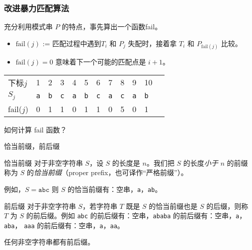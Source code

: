 \documentclass{ctexbeamer}
\newcommand{\str}[1]{\texttt{#1}}
\begin{document}
\begin{frame}
\frametitle{改进暴力匹配算法}
充分利用模式串 $P$ 的特点，事先算出一个函数fail。

\begin{itemize}
\item $\text{fail}(j)$ := 匹配过程中遇到$T_i$ 和 $P_j$ 失配时，接着拿 $T_i$ 和 $P_{\text{fail}(j)}$ 比较。
\item $\text{fail}(j) = 0$ 意味着下一个可能的匹配点是 $i+1$。
\end{itemize}




\begin{table}[]
\begin{tabular}{llllllllllll}
下标$j$ & 1  & 2  & 3 & 4 & 5 & 6 & 7 & 8 & 9 & 10 \\
$S_j$ & \str{a} & \str{b} & \str{c} & \str{a} & \str{b} & \str{c} & \str{a} & \str{c} & \str{a}  & \str{b} \\
fail($j$) & 0  & 1  & 1 & 0 & 1 & 1 & 0 & 5  & 0  & 1
\end{tabular}
\end{table}

\begin{block}{}
如何计算 fail 函数？
\end{block}




\end{frame}

\begin{frame}{恰当前缀，前后缀}

\begin{block}{恰当前缀}
  对于非空字符串 $S$，设 $S$ 的长度是 $n$。我们把 $S$ 的长度\emph{小于} $n$ 的前缀称为 $S$ 的\emph{恰当前缀}（proper prefix，也可译作``严格前缀''）。

  例如，$S= \str{abc}$ 则 $S$ 的恰当前缀有：空串，\str{a}，\str{ab}。
\end{block}

\begin{block}{前后缀}
对于非空字符串 $S$，若字符串 $T$ 既是 $S$ 的恰当前缀也是 $S$ 的后缀，则称 $T$ 为 $S$ 的前后缀。例如 \str{abc} 的前后缀有：空串，\str{ababa} 的前后缀有：空串，\str{a}，\str{aba}，
\str{aaa} 的前后缀有：空串，\str{a}，\str{aa}。

任何非空字符串都有前后缀。
\end{block}

\end{frame}
\end{document}
